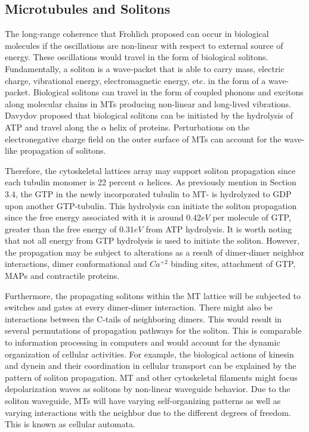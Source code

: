 \documentclass[letterpaper,final,times]{cas-dc}
\numberwithin{equation}{section}
\begin{document}
\subsection{Microtubules and Solitons}\noindent
The long-range coherence that Frohlich proposed can occur in biological molecules\citep{25} if the oscillations are non-linear with respect to external source of energy. These oscillations would travel in the form of biological solitons. Fundamentally, a soliton is a wave-packet that is able to carry mass, electric charge, vibrational energy, electromagnetic energy, etc. in the form of a wave-packet\citep{73}. Biological solitons can travel in the form of coupled phonons and excitons along molecular chains in MTs producing non-linear and long-lived\citep{72} vibrations. Davydov proposed that biological solitons can be initiated by the hydrolysis of ATP and travel along the $\alpha$ helix of proteins\citep{74, 75}. Perturbations on the electronegative charge field on the outer surface of MTs can account for the wave-like propagation of solitons.

Therefore, the cytoskeletal lattices array may support soliton propagation since each tubulin monomer is 22 percent $\alpha$ helices. As previously mention in Section 3.4, the GTP in the newly incorporated tubulin to MT- is hydrolyzed to GDP upon another GTP-tubulin. This hydrolysis can initiate the soliton propagation since the free energy associated with it is around $0.42 eV$ per molecule of GTP, greater than the free energy of $0.31 eV$ from ATP hydrolysis. It is worth noting that not all energy from GTP hydrolysis is used to initiate the soliton\citep{76}. However, the propagation may be subject to alterations as a result of dimer-dimer neighbor interactions, dimer conformational and $Ca^{+2}$ binding sites, attachment of GTP, MAPs and contractile proteins.

Furthermore, the propagating solitons within the MT lattice will be subjected to switches and gates at every dimer-dimer interaction. There might also be interactions between the C-tails of neighboring dimers. This would result in several permutations of propagation pathways for the soliton. This is comparable to information processing in computers and would account for the dynamic organization of cellular activities\citep{77}. For example, the biological actions of kinesin and dynein and their coordination in cellular transport can be explained by the pattern of soliton propagation. MT and other cytoskeletal
filaments might focus depolarization waves as solitons by non-linear waveguide behavior\citep{78}. Due to the soliton waveguide, MTs will have varying self-organizing patterns as well as varying interactions with the neighbor due to the different degrees of freedom. This is known as cellular automata.
\end{document}

